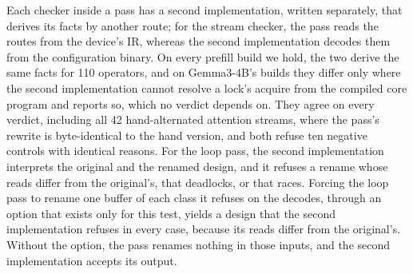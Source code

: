 Each checker inside a pass has a second implementation, written separately, that derives its facts by another route; for the stream checker, the pass reads the routes from the device's IR, whereas the second implementation decodes them from the configuration binary.
On every prefill build we hold, the two derive the same facts for 110 operators, and on Gemma3-4B's builds they differ only where the second implementation cannot resolve a lock's acquire from the compiled core program and reports so, which no verdict depends on.
They agree on every verdict, including all 42 hand-alternated attention streams, where the pass's rewrite is byte-identical to the hand version, and both refuse ten negative controls with identical reasons.
For the loop pass, the second implementation interprets the original and the renamed design, and it refuses a rename whose reads differ from the original's, that deadlocks, or that races.
Forcing the loop pass to rename one buffer of each class it refuses on the decodes, through an option that exists only for this test, yields a design that the second implementation refuses in every case, because its reads differ from the original's.
Without the option, the pass renames nothing in those inputs, and the second implementation accepts its output.

